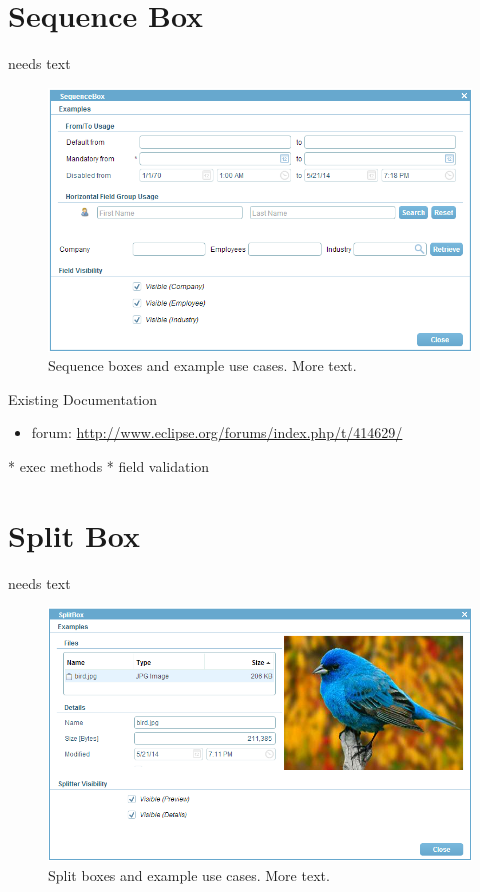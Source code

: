 \documentclass[a4paper,10pt,twoside]{book}
\begin{document}
{\section{Sequence Box}
needs text

\begin{figure}
\includegraphics[width=15cm]{sequencebox.png}
\caption{Sequence boxes and example use cases.
More text.}
\end{figure}

\noindent Existing Documentation
\begin{itemize}
  \item forum: \url{http://www.eclipse.org/forums/index.php/t/414629/}
\end{itemize}

* exec methods
* field validation

\section{Split Box}
needs text

\begin{figure}
\includegraphics[width=15cm]{splitbox.png}
\caption{Split boxes and example use cases.
More text.}
\end{figure}


}
\end{document}
